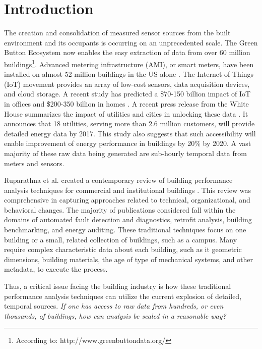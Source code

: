 \section{Introduction}

The creation and consolidation of measured sensor sources from the built environment and its occupants is occurring on an unprecedented scale. The Green Button Ecosystem now enables the easy extraction of data from over 60 million buildings\footnote{According to: http://www.greenbuttondata.org/}. Advanced metering infrastructure (AMI), or smart meters, have been installed on almost 52 million buildings in the US alone \cite{energy_information_administration_how_2015}. The Internet-of-Things (IoT) movement provides an array of low-cost sensors, data acquisition devices, and cloud storage. A recent study has predicted a \$70-150 billion impact of IoT in offices and \$200-350 billion in homes \cite{james_manyika_unlocking_2015}. A recent press release from the White House summarizes the impact of utilities and cities in unlocking these data \cite{_fact_2016}. It announces that 18 utilities, serving more than 2.6 million customers, will provide detailed energy data by 2017. This study also suggests that such accessibility will enable improvement of energy performance in buildings by 20\% by 2020. A vast majority of these raw data being generated are sub-hourly temporal data from meters and sensors.

Ruparathna et al. created a contemporary review of building performance analysis techniques for commercial and institutional buildings \cite{ruparathna_improving_2016}. This review was comprehensive in capturing approaches related to technical, organizational, and behavioral changes. The majority of publications considered fall within the domains of automated fault detection and diagnostics, retrofit analysis, building benchmarking, and energy auditing. These traditional techniques focus on one building or a small, related collection of buildings, such as a campus. Many require complex characteristic data about each building, such as it geometric dimensions, building materials, the age of type of mechanical systems, and other metadata, to execute the process. 

Thus, a critical issue facing the building industry is how these traditional performance analysis techniques can utilize the current explosion of detailed, temporal sources. \emph{If one has access to raw data from hundreds, or even thousands, of buildings, how can analysis be scaled in a reasonable way?} 

